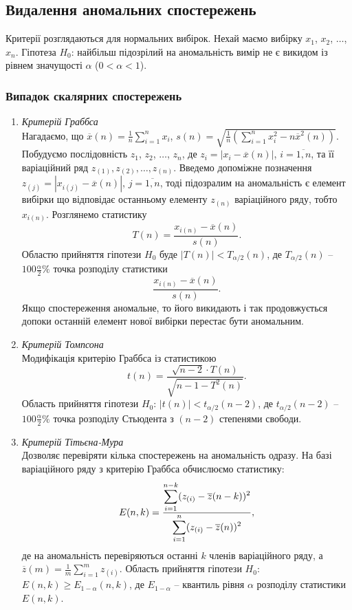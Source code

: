 \subsection{Видалення аномальних спостережень}

Критерії розглядаються для нормальних вибірок. Нехай маємо вибірку $x_1$, $x_2$, $\ldots$, $x_n$. Гіпотеза $H_0$: найбільш підозрілий на аномальність вимір не є викидом із рівнем значущості $\alpha$ ($0 < \alpha < 1$). 

\subsubsection{Випадок скалярних спостережень}

\begin{enumerate}
	\item \textit{Критерій Граббса} \\ 

	Нагадаємо, що $\overline{x}(n) = \frac{1}{n} \sum_{i = 1}^n x_i$, $s(n) = \sqrt{\frac{1}{n} \left( \sum_{i = 1}^n x_i^2 - n \overline{x}^2(n) \right)}$. Побудуємо послідовність $z_1$, $z_2$, $\ldots$, $z_n$, де $z_i = |x_i - \overline{x}(n)|$, $i = \overline{1, n}$, та її варіаційний ряд $z_{(1)}, z_{(2)}, \ldots, z_{(n)}$. Введемо допоміжне позначення $z_{(j)} = \left| x_{i(j)} - \overline{x}(n) \right|$, $j = \overline{1, n}$, тоді підозралим на аномальність є елемент вибірки що відповідає останньому елементу $z_{(n)}$ варіаційного ряду, тобто $x_{i(n)}$. Розглянемо статистику \[ T(n) = \dfrac{x_{i(n)} - \overline{x}(n)}{s(n)}. \] Областю прийняття гіпотези $H_0$ буде $|T(n)| < T_{\alpha/2}(n)$, де $T_{\alpha/2}(n)$ -- $100\frac{\alpha}{2}\%$ точка розподілу статистики \[\dfrac{x_{i(n)} - \overline{x}(n)}{s(n)}.\] Якщо спостереження аномальне, то його викидають і так продовжується допоки останній елемент нової вибірки перестає бути аномальним.

	\item \textit{Критерій Томпсона} \\

	Модифікація критерію Граббса із статистикою \[ t(n) = \dfrac{\sqrt{n - 2} \cdot T(n)}{\sqrt{n - 1 - T^2(n)}}. \] Область прийняття гіпотези $H_0$: $|t(n)| < t_{\alpha/2}(n - 2)$, де $t_{\alpha/2}(n - 2)$ -- $100\frac{\alpha}{2}\%$ точка розподілу Стьюдента з $(n - 2)$ степенями свободи.

	\item \textit{Критерій Тітьєна-Мура} \\

	Дозволяє перевіряти кілька спостережень на аномальність одразу. На базі варіаційного ряду з критерію Граббса обчислюємо статистику: \[ E(n, k) = \dfrac{\displaystyle\sum\limits_{i = 1}^{n - k} (z_{(i)} - \overline{z}(n - k))^2}{\displaystyle\sum\limits_{i = 1}^n (z_{(i)} - \overline{z}(n))^2}, \] де на аномальність перевіряються останні $k$ членів варіаційного ряду, а $\overline{z}(m) = \frac{1}{m} \sum_{i = 1}^{m} z_{(i)}$. Область прийняття гіпотези $H_0$: $E(n, k) \ge E_{1 - \alpha} (n, k)$, де $E_{1 - \alpha}$ -- квантиль рівня $\alpha$ розподілу статистики $E(n, k)$.
\end{enumerate}

